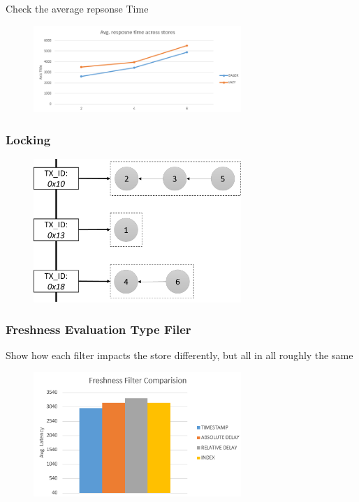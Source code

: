 Check the average repsonse Time
\begin{figure}[t] 
    \centering 
    \includegraphics[width=0.7\textwidth]{Figures/hsql_avg_response_stores.PNG}
    \caption{}
    \label{fig:}
\end{figure}


\subsubsection{Locking } 
\begin{figure}[t] 
    \centering 
    \includegraphics[width=0.7\textwidth]{Figures/store_comparision.png}
    \caption{}
    \label{fig:}
\end{figure}


\subsubsection{Freshness Evaluation Type Filer} 
Show how each filter impacts the store differently, but all in all roughly the same
\begin{figure}[t] 
    \centering 
    \includegraphics[width=0.7\textwidth]{Figures/freshness_comp.PNG}
    \caption{}
    \label{fig:}
\end{figure}


